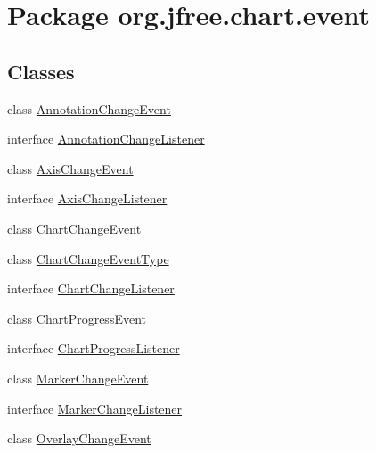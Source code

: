 \hypertarget{namespaceorg_1_1jfree_1_1chart_1_1event}{}\section{Package org.\+jfree.\+chart.\+event}
\label{namespaceorg_1_1jfree_1_1chart_1_1event}
\subsection*{Classes}
\begin{DoxyCompactItemize}
\item 
class \mbox{\hyperlink{classorg_1_1jfree_1_1chart_1_1event_1_1_annotation_change_event}{Annotation\+Change\+Event}}
\item 
interface \mbox{\hyperlink{interfaceorg_1_1jfree_1_1chart_1_1event_1_1_annotation_change_listener}{Annotation\+Change\+Listener}}
\item 
class \mbox{\hyperlink{classorg_1_1jfree_1_1chart_1_1event_1_1_axis_change_event}{Axis\+Change\+Event}}
\item 
interface \mbox{\hyperlink{interfaceorg_1_1jfree_1_1chart_1_1event_1_1_axis_change_listener}{Axis\+Change\+Listener}}
\item 
class \mbox{\hyperlink{classorg_1_1jfree_1_1chart_1_1event_1_1_chart_change_event}{Chart\+Change\+Event}}
\item 
class \mbox{\hyperlink{classorg_1_1jfree_1_1chart_1_1event_1_1_chart_change_event_type}{Chart\+Change\+Event\+Type}}
\item 
interface \mbox{\hyperlink{interfaceorg_1_1jfree_1_1chart_1_1event_1_1_chart_change_listener}{Chart\+Change\+Listener}}
\item 
class \mbox{\hyperlink{classorg_1_1jfree_1_1chart_1_1event_1_1_chart_progress_event}{Chart\+Progress\+Event}}
\item 
interface \mbox{\hyperlink{interfaceorg_1_1jfree_1_1chart_1_1event_1_1_chart_progress_listener}{Chart\+Progress\+Listener}}
\item 
class \mbox{\hyperlink{classorg_1_1jfree_1_1chart_1_1event_1_1_marker_change_event}{Marker\+Change\+Event}}
\item 
interface \mbox{\hyperlink{interfaceorg_1_1jfree_1_1chart_1_1event_1_1_marker_change_listener}{Marker\+Change\+Listener}}
\item 
class \mbox{\hyperlink{classorg_1_1jfree_1_1chart_1_1event_1_1_overlay_change_event}{Overlay\+Change\+Event}}
\item 

\end{DoxyCompactItemize}
